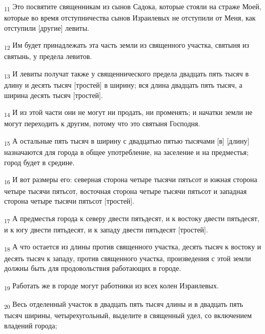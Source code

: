 \begin{tcolorbox}
\textsubscript{11} Это посвятите священникам из сынов Садока, которые стояли на страже Моей, которые во время отступничества сынов Израилевых не отступили от Меня, как отступили [другие] левиты.
\end{tcolorbox}
\begin{tcolorbox}
\textsubscript{12} Им будет принадлежать эта часть земли из священного участка, святыня из святынь, у предела левитов.
\end{tcolorbox}
\begin{tcolorbox}
\textsubscript{13} И левиты получат также у священнического предела двадцать пять тысяч в длину и десять тысяч [тростей] в ширину; вся длина двадцать пять тысяч, а ширина десять тысяч [тростей].
\end{tcolorbox}
\begin{tcolorbox}
\textsubscript{14} И из этой части они не могут ни продать, ни променять; и начатки земли не могут переходить к другим, потому что это святыня Господня.
\end{tcolorbox}
\begin{tcolorbox}
\textsubscript{15} А остальные пять тысяч в ширину с двадцатью пятью тысячами [в] [длину] назначаются для города в общее употребление, на заселение и на предместья; город будет в средине.
\end{tcolorbox}
\begin{tcolorbox}
\textsubscript{16} И вот размеры его: северная сторона четыре тысячи пятьсот и южная сторона четыре тысячи пятьсот, восточная сторона четыре тысячи пятьсот и западная сторона четыре тысячи пятьсот [тростей].
\end{tcolorbox}
\begin{tcolorbox}
\textsubscript{17} А предместья города к северу двести пятьдесят, и к востоку двести пятьдесят, и к югу двести пятьдесят, и к западу двести пятьдесят [тростей].
\end{tcolorbox}
\begin{tcolorbox}
\textsubscript{18} А что остается из длины против священного участка, десять тысяч к востоку и десять тысяч к западу, против священного участка, произведения с этой земли должны быть для продовольствия работающих в городе.
\end{tcolorbox}
\begin{tcolorbox}
\textsubscript{19} Работать же в городе могут работники из всех колен Израилевых.
\end{tcolorbox}
\begin{tcolorbox}
\textsubscript{20} Весь отделенный участок в двадцать пять тысяч длины и в двадцать пять тысяч ширины, четырехугольный, выделите в священный удел, со включением владений города;
\end{tcolorbox}
